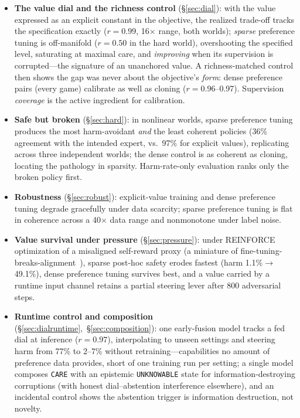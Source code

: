 \documentclass[11pt]{article}
\newcommand{\care}{\texttt{CARE}}
\newcommand{\unknown}{\texttt{UNKNOWABLE}}
\begin{document}
\begin{itemize}
\item \textbf{The value dial and the richness control} (\S\ref{sec:dial}): with the value expressed as an explicit constant in the objective, the realized trade-off tracks the specification exactly ($r{=}0.99$, 16$\times$ range, both worlds); \emph{sparse} preference tuning is off-manifold ($r{=}0.50$ in the hard world), overshooting the specified level, saturating at maximal care, and \emph{improving} when its supervision is corrupted---the signature of an unanchored value. A richness-matched control then shows the gap was never about the objective's \emph{form}: dense preference pairs (every game) calibrate as well as cloning ($r{=}0.96$--0.97). Supervision \emph{coverage} is the active ingredient for calibration.
\item \textbf{Safe but broken} (\S\ref{sec:hard}): in nonlinear worlds, sparse preference tuning produces the most harm-avoidant \emph{and} the least coherent policies (36\% agreement with the intended expert, vs.\ 97\% for explicit values), replicating across three independent worlds; the dense control is as coherent as cloning, locating the pathology in sparsity. Harm-rate-only evaluation ranks only the broken policy first.
\item \textbf{Robustness} (\S\ref{sec:robust}): explicit-value training and dense preference tuning degrade gracefully under data scarcity; sparse preference tuning is flat in coherence across a 40$\times$ data range and nonmonotone under label noise.
\item \textbf{Value survival under pressure} (\S\ref{sec:pressure}): under REINFORCE optimization of a misaligned self-reward proxy (a miniature of fine-tuning-breaks-alignment~\cite{qi2023finetuning}), sparse post-hoc safety erodes fastest (harm 1.1\%$\to$49.1\%), dense preference tuning survives best, and a value carried by a runtime input channel retains a partial steering lever after 800 adversarial steps.
\item \textbf{Runtime control and composition} (\S\ref{sec:dialruntime},~\S\ref{sec:composition}): one early-fusion model tracks a fed dial at inference ($r{=}0.97$), interpolating to unseen settings and steering harm from 77\% to 2--7\% without retraining---capabilities no amount of preference data provides, short of one training run per setting; a single model composes \care{} with an epistemic \unknown{} state for information-destroying corruptions (with honest dial--abstention interference elsewhere), and an incidental control shows the abstention trigger is information destruction, not novelty.
\end{itemize}
\end{document}
